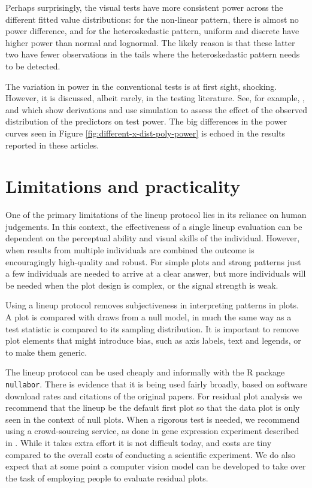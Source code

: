 \documentclass[]{interact}
\theoremstyle{plain}%
\theoremstyle{definition}
\theoremstyle{remark}
\begin{document}
Perhaps surprisingly, the visual tests have more consistent power across
the different fitted value distributions: for the non-linear pattern,
there is almost no power difference, and for the heteroskedastic
pattern, uniform and discrete have higher power than normal and
lognormal. The likely reason is that these latter two have fewer
observations in the tails where the heteroskedastic pattern needs to be
detected.

The variation in power in the conventional tests is at first sight,
shocking. However, it is discussed, albeit rarely, in the testing
literature. See, for example, \citet{jamshidian2007study},
\citet{olvera2019relationship} and \citet{zhang2018practical} which show
derivations and use simulation to assess the effect of the observed
distribution of the predictors on test power. The big differences in the
power curves seen in Figure \ref{fig:different-x-dist-poly-power} is
echoed in the results reported in these articles.

\hypertarget{limitations-and-practicality}{%
\section{Limitations and
practicality}\label{limitations-and-practicality}}

One of the primary limitations of the lineup protocol lies in its
reliance on human judgements. In this context, the effectiveness of a
single lineup evaluation can be dependent on the perceptual ability and
visual skills of the individual. However, when results from multiple
individuals are combined the outcome is encouragingly high-quality and
robust. For simple plots and strong patterns just a few individuals are
needed to arrive at a clear answer, but more individuals will be needed
when the plot design is complex, or the signal strength is weak.

Using a lineup protocol removes subjectiveness in interpreting patterns
in plots. A plot is compared with draws from a null model, in much the
same way as a test statistic is compared to its sampling distribution.
It is important to remove plot elements that might introduce bias, such
as axis labels, text and legends, or to make them generic.

The lineup protocol can be used cheaply and informally with the R
package \texttt{nullabor}. There is evidence that it is being used
fairly broadly, based on software download rates and citations of the
original papers. For residual plot analysis we recommend that the lineup
be the default first plot so that the data plot is only seen in the
context of null plots. When a rigorous test is needed, we recommend
using a crowd-sourcing service, as done in gene expression experiment
described in \citet{RNAseq2013}. While it takes extra effort it is not
difficult today, and costs are tiny compared to the overall costs of
conducting a scientific experiment. We do also expect that at some point
a computer vision model can be developed to take over the task of
employing people to evaluate residual plots.
\end{document}
